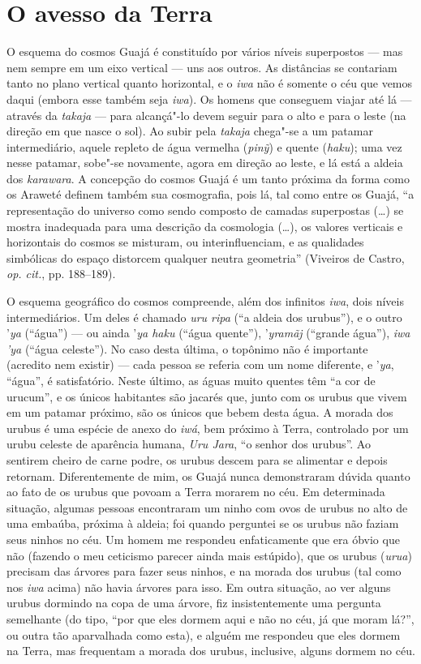 \section{O avesso da Terra}

O esquema do cosmos Guajá é constituído por vários níveis superpostos ---
mas nem sempre em um eixo vertical --- uns aos outros. As distâncias se
contariam tanto no plano vertical quanto horizontal, e o \emph{iwa} não
é somente o céu que vemos daqui (embora esse também seja \emph{iwa}). Os
homens que conseguem viajar até lá --- através da \emph{takaja} --- para
alcançá"-lo devem seguir para o alto e para o leste (na direção em que
nasce o sol). Ao subir pela \emph{takaja} chega"-se a um patamar
intermediário, aquele repleto de água vermelha (\emph{pinỹ}) e quente
(\emph{haku}); uma vez nesse patamar, sobe"-se novamente, agora em
direção ao leste, e lá está a aldeia dos \emph{karawara}. A concepção do
cosmos Guajá é um tanto próxima da forma como os Araweté definem também
sua cosmografia, pois lá, tal como entre os Guajá, ``a representação do
universo como sendo composto de camadas superpostas (\ldots{}) se mostra
inadequada para uma descrição da cosmologia (\ldots{}), os valores verticais
e horizontais do cosmos se misturam, ou interinfluenciam, e as
qualidades simbólicas do espaço distorcem qualquer neutra geometria''
(Viveiros de Castro, \emph{op. cit.}, pp. 188--189).

O esquema geográfico do cosmos compreende, além dos infinitos
\emph{iwa}, dois níveis intermediários. Um deles é chamado \emph{uru
ripa} (``a aldeia dos urubus''), e o outro '\emph{ya} (``água'') --- ou ainda
'\emph{ya haku} (``água quente''), '\emph{yramãj} (``grande água''),
\emph{iwa 'ya} (``água celeste''). No caso desta última, o topônimo não é
importante (acredito nem existir) --- cada pessoa se referia com um nome
diferente, e '\emph{ya}, ``água'', é satisfatório. Neste último, as águas
muito quentes têm ``a cor de urucum'', e os únicos habitantes são jacarés
que, junto com os urubus que vivem em um patamar próximo, são os únicos
que bebem desta água. A morada dos urubus é uma espécie de anexo do
\emph{iwá}, bem próximo à Terra, controlado por um urubu celeste de
aparência humana, \emph{Uru Jara}, ``o senhor dos urubus''. Ao sentirem
cheiro de carne podre, os urubus descem para se alimentar e depois
retornam. Diferentemente de mim, os Guajá nunca demonstraram dúvida
quanto ao fato de os urubus que povoam a Terra morarem no céu. Em
determinada situação, algumas pessoas encontraram um ninho com ovos de
urubus no alto de uma embaúba, próxima à aldeia; foi quando perguntei se
os urubus não faziam seus ninhos no céu. Um homem me respondeu
enfaticamente que era óbvio que não (fazendo o meu ceticismo parecer
ainda mais estúpido), que os urubus (\emph{urua}) precisam das árvores
para fazer seus ninhos, e na morada dos urubus (tal como nos \emph{iwa}
acima) não havia árvores para isso. Em outra situação, ao ver alguns
urubus dormindo na copa de uma árvore, fiz insistentemente uma pergunta
semelhante (do tipo, ``por que eles dormem aqui e não no céu, já que
moram lá?'', ou outra tão aparvalhada como esta), e alguém me respondeu
que eles dormem na Terra, mas frequentam a morada dos urubus, inclusive,
alguns dormem no céu.

